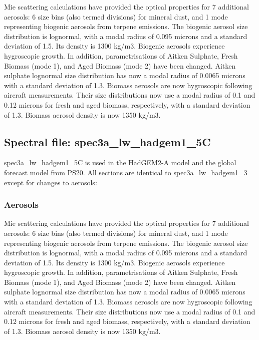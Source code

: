 Mie scattering calculations have provided the optical properties for 7 additional aerosols: 6 size bins (also termed divisions) for mineral dust, and 1 mode representing biogenic aerosols from terpene emissions. The biogenic aerosol size distribution is lognormal, with a modal radius of 0.095 microns and a standard deviation of 1.5. Its density is 1300 kg/m3. Biogenic aerosols experience hygroscopic growth. In addition, parametrisations of Aitken Sulphate, Fresh Biomass (mode 1), and Aged Biomass (mode 2) have been changed. Aitken sulphate lognormal size distribution has now a modal radius of 0.0065 microns with a standard deviation of 1.3. Biomass aerosols are now hygroscopic following aircraft measurements. Their size distributions now use a modal radius of 0.1 and 0.12 microns for fresh and aged biomass, respectively, with a standard deviation of 1.3. Biomass aerosol density is now 1350 kg/m3. 


\subsection*{Spectral file: spec3a\_lw\_hadgem1\_5C}

spec3a\_lw\_hadgem1\_5C is used in the HadGEM2-A model and the global forecast model from PS20. All sections are identical to spec3a\_lw\_hadgem1\_3 except for changes to aerosols:


\subsubsection*{Aerosols}

Mie scattering calculations have provided the optical properties for 7 additional aerosols: 6 size bins (also termed divisions) for mineral dust, and 1 mode representing biogenic aerosols from terpene emissions. The biogenic aerosol size distribution is lognormal, with a modal radius of 0.095 microns and a standard deviation of 1.5. Its density is 1300 kg/m3. Biogenic aerosols experience hygroscopic growth. In addition, parametrisations of Aitken Sulphate, Fresh Biomass (mode 1), and Aged Biomass (mode 2) have been changed. Aitken sulphate lognormal size distribution has now a modal radius of 0.0065 microns with a standard deviation of 1.3. Biomass aerosols are now hygroscopic following aircraft measurements. Their size distributions now use a modal radius of 0.1 and 0.12 microns for fresh and aged biomass, respectively, with a standard deviation of 1.3. Biomass aerosol density is now 1350 kg/m3.

